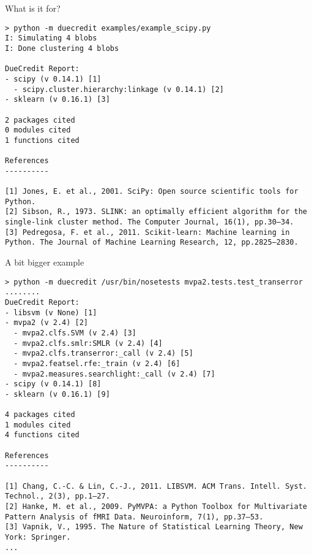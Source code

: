 \documentclass[]{beamer}
\begin{document}
\begin{frame}[t,fragile]{What is it for?}
\begin{Verbatim}[commandchars=\\\{\},fontsize=\scriptsize]
> python -m duecredit examples/example_scipy.py
I: Simulating 4 blobs
I: Done clustering 4 blobs

DueCredit Report:
- scipy (v 0.14.1) [1]
  - scipy.cluster.hierarchy:linkage (v 0.14.1) [2]
- sklearn (v 0.16.1) [3]

2 packages cited
0 modules cited
1 functions cited

References
----------

[1] Jones, E. et al., 2001. SciPy: Open source scientific tools for Python.
[2] Sibson, R., 1973. SLINK: an optimally efficient algorithm for the single-link cluster method. The Computer Journal, 16(1), pp.30–34.
[3] Pedregosa, F. et al., 2011. Scikit-learn: Machine learning in Python. The Journal of Machine Learning Research, 12, pp.2825–2830.
\end{Verbatim}
\end{frame}


\begin{frame}[t,fragile]{A bit bigger example}
\begin{Verbatim}[commandchars=\\\{\},fontsize=\scriptsize]
> python -m duecredit /usr/bin/nosetests mvpa2.tests.test_transerror
........
DueCredit Report:
- libsvm (v None) [1]
- mvpa2 (v 2.4) [2]
  - mvpa2.clfs.SVM (v 2.4) [3]
  - mvpa2.clfs.smlr:SMLR (v 2.4) [4]
  - mvpa2.clfs.transerror:_call (v 2.4) [5]
  - mvpa2.featsel.rfe:_train (v 2.4) [6]
  - mvpa2.measures.searchlight:_call (v 2.4) [7]
- scipy (v 0.14.1) [8]
- sklearn (v 0.16.1) [9]

4 packages cited
1 modules cited
4 functions cited

References
----------

[1] Chang, C.-C. & Lin, C.-J., 2011. LIBSVM. ACM Trans. Intell. Syst. Technol., 2(3), pp.1–27.
[2] Hanke, M. et al., 2009. PyMVPA: a Python Toolbox for Multivariate Pattern Analysis of fMRI Data. Neuroinform, 7(1), pp.37–53.
[3] Vapnik, V., 1995. The Nature of Statistical Learning Theory, New York: Springer.
...
\end{Verbatim}
\end{frame}
\end{document}
